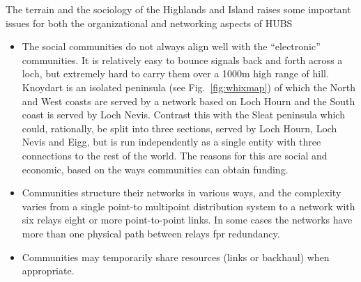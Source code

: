The terrain and the sociology of the Highlands and Island raises some important issues for both the organizational and networking aspects of HUBS
\begin{itemize} 
\item The social communities do not always align well with the ``electronic'' communities. It is relatively easy to bounce signals back and forth across a loch, but extremely hard to carry them over a 1000m high range of hill.  Knoydart is an isolated peninsula (see Fig.~\ref{fig:whixmap})  of which the North and West coasts are served by a network based on Loch Hourn and the South coast is served by Loch Nevis.  Contrast this with the Sleat peninsula which could, rationally,  be split into three sections, served by Loch Hourn, Loch Nevis and Eigg, but is run independently as a single entity with three connections to the rest of the world.  The reasons for this are social and economic, based on the ways communities can obtain funding.
\item Communities structure their networks in various ways, and the complexity varies from a single point-to multipoint distribution system to a network with six relays  eight or more point-to-point links.  In some cases the networks have more than one physical path between relays fpr redundancy.
\item Communities may temporarily share resources (links or backhaul) when appropriate.
\end{itemize}
